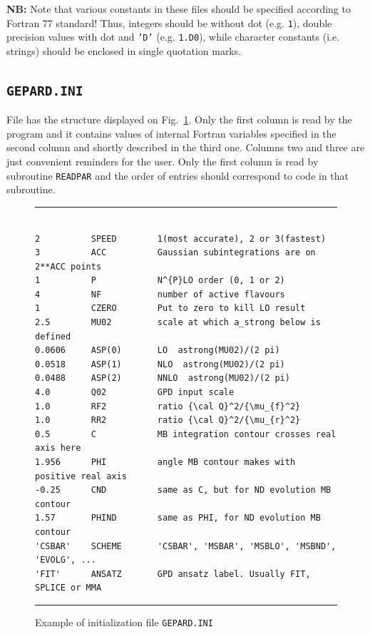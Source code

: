 \documentclass[12pt]{article}
\begin{document}
\textbf{NB:} Note that various constants in these files should be specified
according to Fortran 77 standard! Thus, integers should be without dot (e.g.
\texttt{1}), double precision values with dot and \texttt{'D'} (e.g.
\texttt{1.D0}), while character constants (i.e. strings) should be enclosed in
single quotation marks.

\subsection{\texttt{GEPARD.INI}}
\label{ssect:GEPARD.INI}

File has the structure displayed on Fig.~\ref{fig:GEPARD.INI}.
Only the first column is read by the program and it contains
values of internal Fortran variables specified in the second column and
shortly described in the third one. 
Columns two and three are just convenient reminders for the user. 
Only the first column is read by subroutine \texttt{READPAR} and the
order of entries should correspond to code in that subroutine.  
\begin{figure}[t]
\begin{center}
\hrule
\begin{verbatim}

2          SPEED        1(most accurate), 2 or 3(fastest)
3          ACC          Gaussian subintegrations are on 2**ACC points 
1          P            N^{P}LO order (0, 1 or 2)
4          NF           number of active flavours
1          CZERO        Put to zero to kill LO result
2.5        MU02         scale at which a_strong below is defined
0.0606     ASP(0)       LO  astrong(MU02)/(2 pi)
0.0518     ASP(1)       NLO  astrong(MU02)/(2 pi)
0.0488     ASP(2)       NNLO  astrong(MU02)/(2 pi)
4.0        Q02          GPD input scale
1.0        RF2          ratio {\cal Q}^2/{\mu_{f}^2}
1.0        RR2          ratio {\cal Q}^2/{\mu_{r}^2}
0.5        C            MB integration contour crosses real axis here
1.956      PHI          angle MB contour makes with positive real axis
-0.25      CND          same as C, but for ND evolution MB contour
1.57       PHIND        same as PHI, for ND evolution MB contour
'CSBAR'    SCHEME       'CSBAR', 'MSBAR', 'MSBLO', 'MSBND', 'EVOLG', ...
'FIT'      ANSATZ       GPD ansatz label. Usually FIT, SPLICE or MMA

\end{verbatim}
\hrule
\end{center}
\caption{Example of initialization file \texttt{GEPARD.INI}}
\label{fig:GEPARD.INI}
\end{figure}
\end{document}
